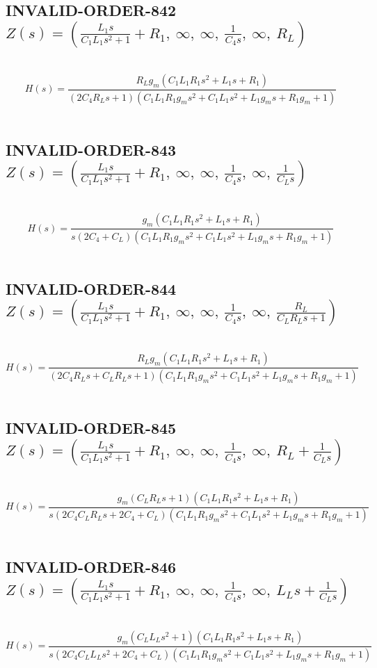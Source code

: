 \documentclass{article}
\begin{document}
\subsection{INVALID-ORDER-842 $Z(s) = \left( \frac{L_{1} s}{C_{1} L_{1} s^{2} + 1} + R_{1}, \  \infty, \  \infty, \  \frac{1}{C_{4} s}, \  \infty, \  R_{L}\right)$ } \ 
\textbf{\[H(s) = \frac{R_{L} g_{m} \left(C_{1} L_{1} R_{1} s^{2} + L_{1} s + R_{1}\right)}{\left(2 C_{4} R_{L} s + 1\right) \left(C_{1} L_{1} R_{1} g_{m} s^{2} + C_{1} L_{1} s^{2} + L_{1} g_{m} s + R_{1} g_{m} + 1\right)}\] } \ 
\subsection{INVALID-ORDER-843 $Z(s) = \left( \frac{L_{1} s}{C_{1} L_{1} s^{2} + 1} + R_{1}, \  \infty, \  \infty, \  \frac{1}{C_{4} s}, \  \infty, \  \frac{1}{C_{L} s}\right)$ } \ 
\textbf{\[H(s) = \frac{g_{m} \left(C_{1} L_{1} R_{1} s^{2} + L_{1} s + R_{1}\right)}{s \left(2 C_{4} + C_{L}\right) \left(C_{1} L_{1} R_{1} g_{m} s^{2} + C_{1} L_{1} s^{2} + L_{1} g_{m} s + R_{1} g_{m} + 1\right)}\] } \ 
\subsection{INVALID-ORDER-844 $Z(s) = \left( \frac{L_{1} s}{C_{1} L_{1} s^{2} + 1} + R_{1}, \  \infty, \  \infty, \  \frac{1}{C_{4} s}, \  \infty, \  \frac{R_{L}}{C_{L} R_{L} s + 1}\right)$ } \ 
\textbf{\[H(s) = \frac{R_{L} g_{m} \left(C_{1} L_{1} R_{1} s^{2} + L_{1} s + R_{1}\right)}{\left(2 C_{4} R_{L} s + C_{L} R_{L} s + 1\right) \left(C_{1} L_{1} R_{1} g_{m} s^{2} + C_{1} L_{1} s^{2} + L_{1} g_{m} s + R_{1} g_{m} + 1\right)}\] } \ 
\subsection{INVALID-ORDER-845 $Z(s) = \left( \frac{L_{1} s}{C_{1} L_{1} s^{2} + 1} + R_{1}, \  \infty, \  \infty, \  \frac{1}{C_{4} s}, \  \infty, \  R_{L} + \frac{1}{C_{L} s}\right)$ } \ 
\textbf{\[H(s) = \frac{g_{m} \left(C_{L} R_{L} s + 1\right) \left(C_{1} L_{1} R_{1} s^{2} + L_{1} s + R_{1}\right)}{s \left(2 C_{4} C_{L} R_{L} s + 2 C_{4} + C_{L}\right) \left(C_{1} L_{1} R_{1} g_{m} s^{2} + C_{1} L_{1} s^{2} + L_{1} g_{m} s + R_{1} g_{m} + 1\right)}\] } \ 
\subsection{INVALID-ORDER-846 $Z(s) = \left( \frac{L_{1} s}{C_{1} L_{1} s^{2} + 1} + R_{1}, \  \infty, \  \infty, \  \frac{1}{C_{4} s}, \  \infty, \  L_{L} s + \frac{1}{C_{L} s}\right)$ } \ 
\textbf{\[H(s) = \frac{g_{m} \left(C_{L} L_{L} s^{2} + 1\right) \left(C_{1} L_{1} R_{1} s^{2} + L_{1} s + R_{1}\right)}{s \left(2 C_{4} C_{L} L_{L} s^{2} + 2 C_{4} + C_{L}\right) \left(C_{1} L_{1} R_{1} g_{m} s^{2} + C_{1} L_{1} s^{2} + L_{1} g_{m} s + R_{1} g_{m} + 1\right)}\] } \ 
\end{document}
